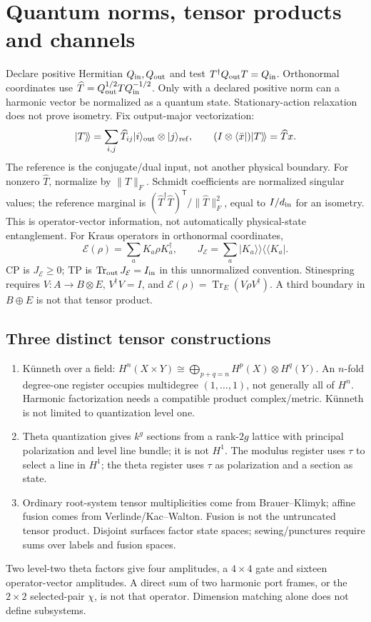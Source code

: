 \documentclass[11pt]{article}
\theoremstyle{definition}
\theoremstyle{remark}
\newcommand{\Tr}{\operatorname{Tr}}
\begin{document}
\section{Quantum norms, tensor products and channels}\label{sec:quantum-contract}

Declare positive Hermitian $Q_{\rm in},Q_{\rm out}$ and test
$T^\dagger Q_{\rm out}T=Q_{\rm in}$. Orthonormal coordinates use
$\widehat T=Q_{\rm out}^{1/2}TQ_{\rm in}^{-1/2}$.
Only with a declared positive norm can a harmonic vector be normalized
as a quantum state. Stationary-action relaxation does not prove isometry.
Fix output-major vectorization:
\[
 |T\rangle\!\rangle=\sum_{i,j}\widehat T_{ij}|i\rangle_{\rm out}
 \otimes|j\rangle_{\rm ref},\qquad
 (I\otimes\langle\bar x|)|T\rangle\!\rangle=\widehat T x .
\]
The reference is the conjugate/dual input, not another physical boundary.
For nonzero $\widehat T$, normalize by $\|\widehat T\|_F$. Schmidt
coefficients are normalized singular values; the reference marginal is
$(\widehat T^\dagger\widehat T)^{\mathsf T}/\|\widehat T\|_F^2$, equal to
$I/d_{\rm in}$ for an isometry. This is operator-vector information,
not automatically physical-state entanglement.
For Kraus operators in orthonormal coordinates,
\[
 \mathcal E(\rho)=\sum_aK_a\rho K_a^\dagger,\qquad
 J_{\mathcal E}=\sum_a|K_a\rangle\!\rangle\langle\!\langle K_a| .
\]
CP is $J_{\mathcal E}\ge0$; TP is $\Tr_{\rm out}J_{\mathcal E}=I_{\rm in}$
in this unnormalized convention. Stinespring requires $V:A\to B\otimes E$,
$V^\dagger V=I$, and $\mathcal E(\rho)=\Tr_E(V\rho V^\dagger)$.
A third boundary in $B\oplus E$ is not that tensor product.

\subsection{Three distinct tensor constructions}
\begin{enumerate}
\item K\"unneth over a field:
$H^n(X\times Y)\cong\bigoplus_{p+q=n}H^p(X)\otimes H^q(Y)$.
An $n$-fold degree-one register occupies multidegree $(1,\ldots,1)$,
not generally all of $H^n$. Harmonic factorization needs a compatible
product complex/metric. K\"unneth is not limited to quantization level one.
\item Theta quantization gives $k^g$ sections from a rank-$2g$ lattice
with principal polarization and level line bundle; it is not $H^1$.
The modulus register uses $\tau$ to select a line in $H^1$; the theta
register uses $\tau$ as polarization and a section as state.
\item Ordinary root-system tensor multiplicities come from
Brauer--Klimyk; affine fusion comes from Verlinde/Kac--Walton.
Fusion is not the untruncated tensor product. Disjoint surfaces factor
state spaces; sewing/punctures require sums over labels and fusion spaces.
\end{enumerate}
Two level-two theta factors give four amplitudes, a $4\times4$ gate and
sixteen operator-vector amplitudes. A direct sum of two harmonic port
frames, or the $2\times2$ selected-pair $\chi$, is not that operator.
Dimension matching alone does not define subsystems.
\end{document}
